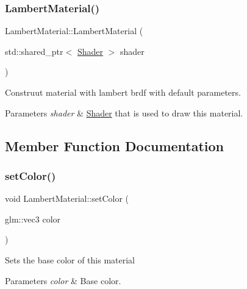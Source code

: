 \subsubsection{\texorpdfstring{LambertMaterial()}{LambertMaterial()}\hspace{0.1cm}{\footnotesize\ttfamily [2/2]}}
{\footnotesize\ttfamily Lambert\+Material\+::\+Lambert\+Material (\begin{DoxyParamCaption}\item[{std\+::shared\+\_\+ptr$<$ \mbox{\hyperlink{class_shader}{Shader}} $>$}]{shader }\end{DoxyParamCaption})}

Construut material with lambert brdf with default parameters.


\begin{DoxyParams}{Parameters}
{\em shader} & \mbox{\hyperlink{class_shader}{Shader}} that is used to draw this material. \\
\hline
\end{DoxyParams}


\subsection{Member Function Documentation}
\mbox{\label{class_lambert_material_a982be68e1db56d7d4980b48172891315}} 
\subsubsection{\texorpdfstring{setColor()}{setColor()}}
{\footnotesize\ttfamily void Lambert\+Material\+::set\+Color (\begin{DoxyParamCaption}\item[{glm\+::vec3}]{color }\end{DoxyParamCaption})\hspace{0.3cm}{\ttfamily [virtual]}}

Sets the base color of this material


\begin{DoxyParams}{Parameters}
{\em color} & Base color. \\
\hline
\end{DoxyParams}
\mbox{\label{class_lambert_material_a2983e583790ba13a782dc49d78358bb7}} 

